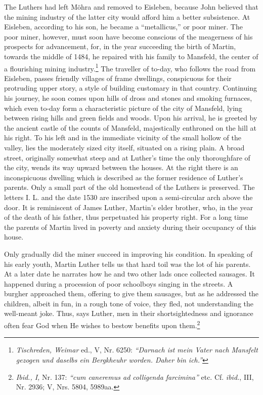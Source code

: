 The Luthers had left Möhra and removed to Eisleben, because John
believed that the mining industry of the latter city would afford
him a better subsistence. At Eisleben, according to his son, he
became a “metallicus,” or poor miner. The poor miner, however,
must soon have become conscious of the meagerness of his prospects
for advancement, for, in the year succeeding the birth of Martin,
towards the middle of 1484, he repaired with his family to Mansfeld,
the center of a flourishing mining industry.\footnote{
\textit{Tischreden, Weimar} ed., V, Nr. 6250: \textit{“Darnach ist mein Vater nach Mansfelt gezogen und daselbs ein Bergkheuhr worden. Daher bin ich.”}
}
The traveller of to-day,
who follows the road from Eisleben, passes friendly villages of frame
dwellings, conspicuous for their protruding upper story, a style of
building customary in that country. Continuing his journey, he soon
comes upon hills of dross and stones and smoking furnaces, which
even to-day form a characteristic picture of the city of Mansfeld,
lying between rising hills and green fields and woods. Upon his arrival,
he is greeted by the ancient castle of the counts of Mansfeld,
majestically enthroned on the hill at his right. To his left and in the
immediate vicinity of the small hollow of the valley, lies the moderately
sized city itself, situated on a rising plain. A broad street,
originally somewhat steep and at Luther’s time the only thoroughfare of the city,
wends its way upward between the houses. At the
right there is an inconspicuous dwelling which is described as the
former residence of Luther’s parents. Only a small part of the old
homestead of the Luthers is preserved. The letters I. L. and the date
1530 are inscribed upon a semi-circular arch above the door. It is
reminiscent of James Luther, Martin’s elder brother, who, in the
year of the death of his father, thus perpetuated his property right.
For a long time the parents of Martin lived in poverty and anxiety
during their occupancy of this house.

Only gradually did the miner succeed in improving his condition.
In speaking of his early youth, Martin Luther tells us that hard toil
was the lot of his parents. At a later date he narrates how he and two
other lads once collected sausages. It happened during a procession of
poor schoolboys singing in the streets. A burgher approached them,
offering to give them sausages, but as he addressed the children,
albeit in fun, in a rough tone of voice, they fled, not understanding
the well-meant joke. Thus, says Luther, men in their shortsightedness
and ignorance often fear God when He wishes to bestow benefits
upon them.\footnote
{\textit{Ibid., I,} Nr. 137: \textit{“cum caneremus ad colligenda farcimina”} etc. Cf. \textit{ibid.}, III, Nr. 2936;
V, Nrs. 5804, 5989aa.}

